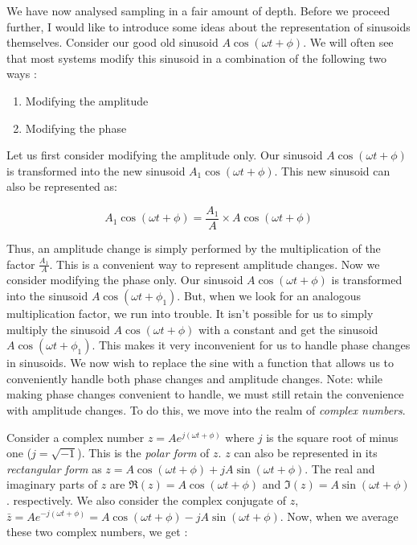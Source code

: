 \documentclass{article}
\theoremstyle{definition}
\begin{document}
		We have now analysed sampling in a fair amount of depth. Before we proceed further, I would like to introduce some ideas about the representation of sinusoids themselves. Consider our good old sinusoid $A\cos(\omega t + \phi)$. We will often see that most systems modify this sinusoid in a combination of the following two ways :
		
		\begin{enumerate}
		\item Modifying the amplitude 
		\item Modifying the phase
		\end{enumerate}
		
		Let us first consider modifying the amplitude only. Our sinusoid $A\cos(\omega t + \phi)$ is transformed into the new sinusoid $A_1 \cos(\omega t + \phi)$. This new sinusoid can also be represented as: 
		
		\[A_1\cos(\omega t + \phi) = \frac{A_1}{A} \times A\cos(\omega t + \phi) \]
		
		Thus, an amplitude change is simply performed by the multiplication of the factor $\frac{A_1}{A}$. This is a convenient way to represent amplitude changes. Now we consider modifying the phase only. Our sinusoid $A\cos(\omega t + \phi)$ is transformed into the sinusoid $A\cos(\omega t + \phi_1)$. But, when we look for an analogous multiplication factor, we run into trouble. It isn't possible for us to simply multiply the sinusoid $A\cos(\omega t + \phi)$ with a constant and get the sinusoid $A\cos(\omega t + \phi_1)$. This makes it very inconvenient for us to handle phase changes in sinusoids. We now wish to replace the sine with a function that allows us to conveniently handle both phase changes and amplitude changes. Note: while making phase changes convenient to handle, we must still retain the convenience with amplitude changes. To do this, we move into the realm of \textit{complex numbers}. \smallskip
		
		Consider a complex number $z = Ae^{j(\omega t + \phi)}$ where $j$ is the square root of minus one ($j = \sqrt{-1}$). This is the \textit{polar form} of $z$. $z$ can also be represented in its \textit{rectangular form} as $z = A\cos(\omega t + \phi) + jA\sin(\omega t + \phi)$. The real and imaginary parts of $z$ are  $\Re(z) = A\cos(\omega t + \phi)$ and $\Im(z) = A\sin(\omega t + \phi)$.  respectively. We also consider the complex conjugate of $z$, $\bar{z} = Ae^{-j(\omega t + \phi)} = A\cos(\omega t + \phi) - jA\sin(\omega t + \phi)$. Now, when we average these two complex numbers, we get :
		
\end{document}
